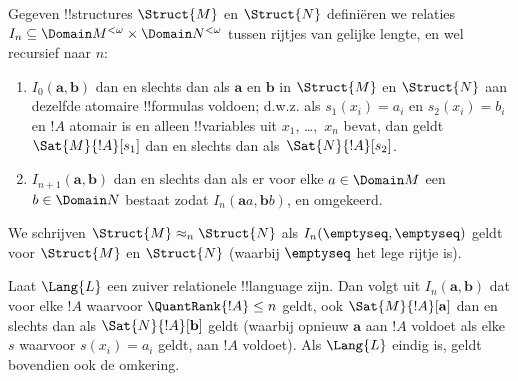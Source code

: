 \documentclass[../../../include/open-logic-section]{subfiles}
\begin{document}
\begin{defn}
  Gegeven !!{structure}s $\Struct{M}$ en $\Struct{N}$ definiëren we
  relaties $I_n \subseteq \Domain M^{<\omega} \times \Domain N^{<\omega}$
  tussen rijtjes van gelijke lengte, en wel recursief naar $n$:
   \begin{enumerate}
   \item $I_0(\mathbf{a},\mathbf{b})$ dan en slechts dan als
     $\mathbf{a}$ en $\mathbf{b}$ in $\Struct{M}$ en $\Struct{N}$
     aan dezelfde atomaire !!{formula}s voldoen; d.w.z. als
     $s_1(x_i) = a_i$ en $s_2(x_i) = b_i$ en $!A$ atomair is en alleen
     !!{variable}s uit $x_1$, \dots,~$x_n$ bevat, dan geldt
     $\Sat{M}{!A}[s_1]$ dan en slechts dan als~$\Sat{N}{!A}[s_2]$.
   \item $I_{n+1} (\mathbf{a},\mathbf{b})$ dan en slechts dan als er
     voor elke $a\in \Domain M$ een $b\in \Domain N$ bestaat zodat
     $I_n(\mathbf{a}a,\mathbf{b}b)$, en omgekeerd.
   \end{enumerate}
\end{defn}


\begin{defn}
  We schrijven $\Struct{M} \approx_n \Struct{N}$ als
  $I_n(\emptyseq,\emptyseq)$ geldt voor $\Struct{M}$ en
  $\Struct{N}$ (waarbij $\emptyseq$ het lege rijtje is).
\end{defn}

\begin{thm}
  Laat $\Lang{L}$ een zuiver relationele !!{language} zijn. Dan volgt
  uit $I_n(\mathbf{a},\mathbf{b})$ dat voor elke $!A$ waarvoor
  $\QuantRank{!A} \le n$ geldt, ook $\Sat{M}{!A}[\mathbf{a}]$ dan en
  slechts dan als $\Sat{N}{!A}[\mathbf{b}]$ geldt (waarbij opnieuw
  $\mathbf{a}$ aan $!A$ voldoet als elke $s$ waarvoor
  $s(x_i) = a_i$ geldt, aan $!A$ voldoet). Als $\Lang{L}$ eindig is,
  geldt bovendien ook de omkering.
\end{thm}
\end{document}
